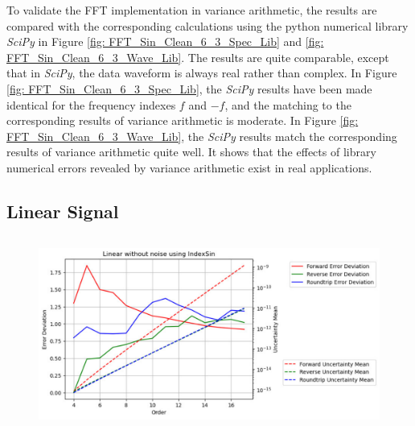 \documentclass[twoside]{article}
\numberwithin{equation}{section}
\begin{document}
To validate the FFT implementation in variance arithmetic, the results are compared with the corresponding calculations using the python numerical library \textit{SciPy} in Figure \ref{fig: FFT_Sin_Clean_6_3_Spec_Lib} and \ref{fig: FFT_Sin_Clean_6_3_Wave_Lib}.
The results are quite comparable, except that in \textit{SciPy}, the data waveform is always real rather than complex.
In Figure \ref{fig: FFT_Sin_Clean_6_3_Spec_Lib}, the \textit{SciPy} results have been made identical for the frequency indexes $f$ and $-f$, and the matching to the corresponding results of variance arithmetic is moderate.
In Figure \ref{fig: FFT_Sin_Clean_6_3_Wave_Lib}, the \textit{SciPy} results match the corresponding results of variance arithmetic quite well.
It shows that the effects of library numerical errors revealed by variance arithmetic exist in real applications.



\subsection{Linear Signal}

\begin{figure}[p]
\centering
\includegraphics[height=2.5in]{FFT_Linear_Clean_vs_Order_Indexed.pdf} 
\label{fig: FFT_Linear_vs_Order_Indexed}
\end{figure}
\end{document}
